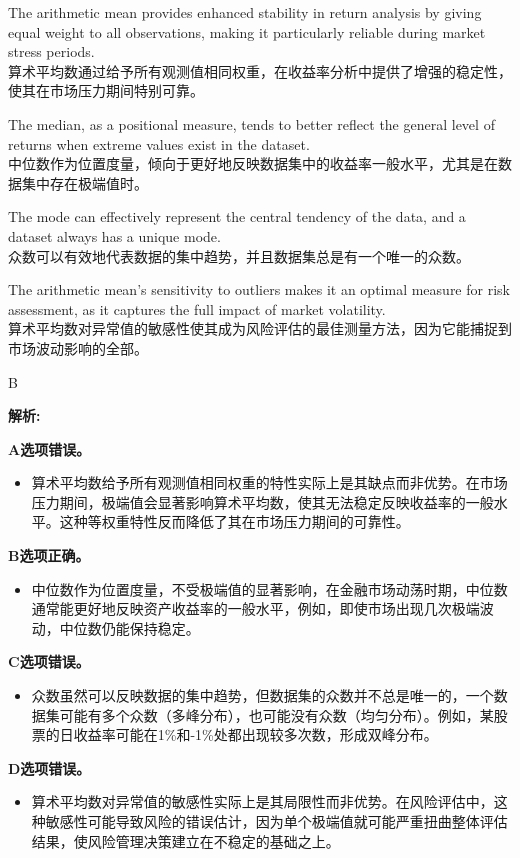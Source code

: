 \documentclass{article}
\newenvironment{explanation}
{\textbf{解析:}\par}
{\par}
\begin{document}
\begin{choices}
    \item The arithmetic mean provides enhanced stability in return analysis by giving equal weight to all observations, making it particularly reliable during market stress periods.\\
    算术平均数通过给予所有观测值相同权重，在收益率分析中提供了增强的稳定性，使其在市场压力期间特别可靠。
    \item The median, as a positional measure, tends to better reflect the general level of returns when extreme values exist in the dataset.\\
    中位数作为位置度量，倾向于更好地反映数据集中的收益率一般水平，尤其是在数据集中存在极端值时。
    \item The mode can effectively represent the central tendency of the data, and a dataset always has a unique mode.\\
    众数可以有效地代表数据的集中趋势，并且数据集总是有一个唯一的众数。
    \item The arithmetic mean's sensitivity to outliers makes it an optimal measure for risk assessment, as it captures the full impact of market volatility.\\
    算术平均数对异常值的敏感性使其成为风险评估的最佳测量方法，因为它能捕捉到市场波动影响的全部。
\end{choices}

\begin{correctanswer}
    B
\end{correctanswer}

\begin{explanation}
\textbf{A选项错误。}
\begin{itemize}
    \item 算术平均数给予所有观测值相同权重的特性实际上是其缺点而非优势。在市场压力期间，极端值会显著影响算术平均数，使其无法稳定反映收益率的一般水平。这种等权重特性反而降低了其在市场压力期间的可靠性。
\end{itemize}

\textbf{B选项正确。}
\begin{itemize}
    \item 中位数作为位置度量，不受极端值的显著影响，在金融市场动荡时期，中位数通常能更好地反映资产收益率的一般水平，例如，即使市场出现几次极端波动，中位数仍能保持稳定。
\end{itemize}

\textbf{C选项错误。}
\begin{itemize}
    \item 众数虽然可以反映数据的集中趋势，但数据集的众数并不总是唯一的，一个数据集可能有多个众数（多峰分布），也可能没有众数（均匀分布）。例如，某股票的日收益率可能在1\%和-1\%处都出现较多次数，形成双峰分布。
\end{itemize}

\textbf{D选项错误。}
\begin{itemize}
    \item 算术平均数对异常值的敏感性实际上是其局限性而非优势。在风险评估中，这种敏感性可能导致风险的错误估计，因为单个极端值就可能严重扭曲整体评估结果，使风险管理决策建立在不稳定的基础之上。
\end{itemize}
\end{explanation}
\end{document}
